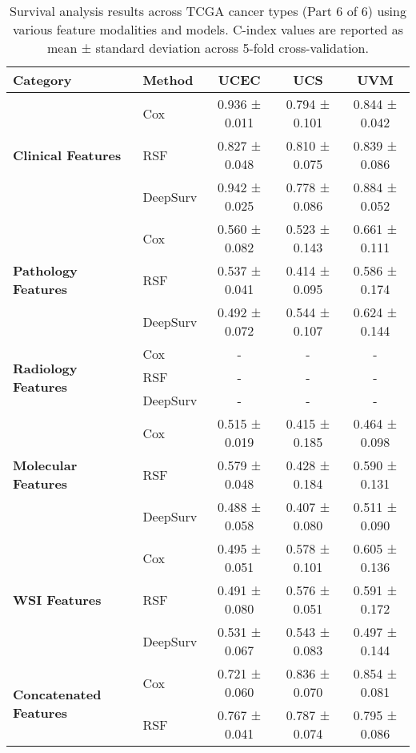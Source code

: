 \begin{sidewaystable}[htbp]
    \centering
    \caption{Survival analysis results across TCGA cancer types (Part 6 of 6) using various feature modalities and models. C-index values are reported as mean ± standard deviation across 5-fold cross-validation.}
    \label{tab:survival_results_6}
    \begin{tabular}{@{}llccc@{}}
        \toprule
        \textbf{Category} & \textbf{Method} & \textbf{UCEC} & \textbf{UCS} & \textbf{UVM} \\
        \midrule
        \multirow{3}{*}{\textbf{Clinical Features}} & Cox & 0.936 ± 0.011 & 0.794 ± 0.101 & 0.844 ± 0.042 \\
        & RSF & 0.827 ± 0.048 & 0.810 ± 0.075 & 0.839 ± 0.086 \\
        & DeepSurv & 0.942 ± 0.025 & 0.778 ± 0.086 & 0.884 ± 0.052 \\
        \midrule
        \multirow{3}{*}{\textbf{Pathology Features}} & Cox & 0.560 ± 0.082 & 0.523 ± 0.143 & 0.661 ± 0.111 \\
        & RSF & 0.537 ± 0.041 & 0.414 ± 0.095 & 0.586 ± 0.174 \\
        & DeepSurv & 0.492 ± 0.072 & 0.544 ± 0.107 & 0.624 ± 0.144 \\
        \midrule
        \multirow{3}{*}{\textbf{Radiology Features}} & Cox & - & - & - \\
        & RSF & - & - & - \\
        & DeepSurv & - & - & - \\
        \midrule
        \multirow{3}{*}{\textbf{Molecular Features}} & Cox & 0.515 ± 0.019 & 0.415 ± 0.185 & 0.464 ± 0.098 \\
        & RSF & 0.579 ± 0.048 & 0.428 ± 0.184 & 0.590 ± 0.131 \\
        & DeepSurv & 0.488 ± 0.058 & 0.407 ± 0.080 & 0.511 ± 0.090 \\
        \midrule
        \multirow{3}{*}{\textbf{WSI Features}} & Cox & 0.495 ± 0.051 & 0.578 ± 0.101 & 0.605 ± 0.136 \\
        & RSF & 0.491 ± 0.080 & 0.576 ± 0.051 & 0.591 ± 0.172 \\
        & DeepSurv & 0.531 ± 0.067 & 0.543 ± 0.083 & 0.497 ± 0.144 \\
        \midrule
        \multirow{3}{*}{\textbf{Concatenated Features}} & Cox & 0.721 ± 0.060 & 0.836 ± 0.070 & 0.854 ± 0.081 \\
        & RSF & 0.767 ± 0.041 & 0.787 ± 0.074 & 0.795 ± 0.086 \\

\end{tabular}
\end{sidewaystable}
